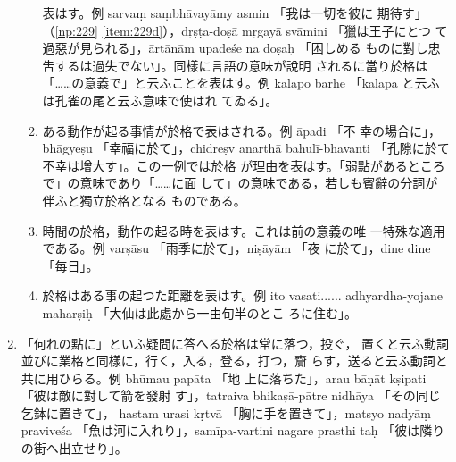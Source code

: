 \begin{enumerate}[label=(\arabic*)]
\begin{enumerate}[label=(\alph*)]
表はす。例 sarvaṃ saṃbhāvayāmy asmin 「我は一切を彼に
期待す」（\ref{np:229} \ref{item:229d}），dṛṣṭa-doṣā mṛgayā svāmini 「獵は王子にとつ
て過惡が見られる」，ārtānām upadeśe na doṣaḥ 「困しめる
ものに對し忠吿するは過失でない」。同樣に言語の意味が說明
されるに當り於格は「……の意義で」と云ふことを表はす。例
kalāpo barhe 「kalāpa と云ふは孔雀の尾と云ふ意味で使はれ
てゐる」。
\item ある動作が起る事情が於格で表はされる。例 āpadi 「不
幸の場合に」，bhāgyeṣu 「幸福に於て」，chidreṣv anarthā
bahulī-bhavanti 「孔隙に於て不幸は增大す」。この一例では於格
が理由を表はす。「弱點があるところで」の意味であり「……に面
して」の意味である，若しも賓辭の分詞が伴ふと獨立於格となる
ものである。
\item 時間の於格，動作の起る時を表はす。これは前の意義の唯
一特殊な適用である。例 varṣāsu 「雨季に於て」，niṣāyām 「夜
に於て」，dine dine 「每日」。
\item 於格はある事の起つた距離を表はす。例 ito vasati......
adhyardha-yojane maharṣiḥ 「大仙は此處から一由旬半のとこ
ろに住む」。
\end{enumerate}
\item 「何れの點に」といふ疑問に答へる於格は常に落つ，投ぐ，
置くと云ふ動詞並びに業格と同樣に，行く，入る，登る，打つ，齎
らす，送ると云ふ動詞と共に用ひらる。例 bhūmau papāta 「地
上に落ちた」，arau bāṇāt kṣipati 「彼は敵に對して箭を發射
す」，tatraiva bhikaṣā-pātre nidhāya 「その同じ乞鉢に置きて」，
hastam urasi kṛtvā 「胸に手を置きて」，matsyo nadyāṃ
praviveśa 「魚は河に入れり」，samīpa-vartini nagare prasthi\-%
taḥ 「彼は隣りの街へ出立せり」。


\end{enumerate}
